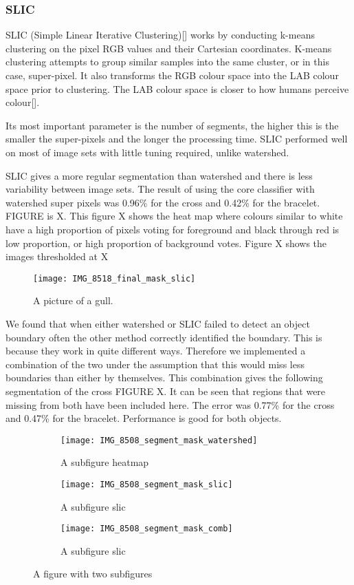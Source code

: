 \documentclass[12pt]{IIBproject}
\begin{document}
\subsubsection{SLIC}
SLIC (Simple Linear Iterative Clustering)[] works by conducting k-means clustering on the pixel RGB values and their Cartesian coordinates. K-means clustering attempts to group similar samples into the same cluster, or in this case, super-pixel. It also transforms the RGB colour space into the LAB colour space prior to clustering. The LAB colour space is closer to how humans perceive colour[].

 Its most important parameter is the number of segments, the higher this is the smaller the super-pixels and the longer the processing time. SLIC performed well on most of image sets with little tuning required, unlike watershed. 
 
SLIC gives a more regular segmentation than watershed and there is less variability between image sets. The result of using the core classifier with watershed super pixels was 0.96\% for the cross and 0.42\% for the bracelet. FIGURE is X. This figure X shows the heat map where colours similar to white have a high proportion of pixels voting for foreground and black through red is low proportion, or high proportion of background votes. Figure X shows the images thresholded at X%
\begin{figure}[H]
  \caption{A picture of a gull.}
  \centering
    \texttt{[image: IMG\_8518\_final\_mask\_slic]}
\end{figure}
We found that when either watershed or SLIC failed to detect an object boundary  often the other method correctly identified the boundary. This is because they work in quite different ways. Therefore we implemented a combination of the two under the assumption that this would miss less boundaries than either by themselves. This combination gives the following segmentation of the cross FIGURE X. It can be seen that regions that were missing from both have been included here. The error was 0.77\% for the cross and 0.47\% for the bracelet. Performance is good for both objects. 

 \begin{figure}[H]
\centering
\begin{subfigure}{.5\textwidth}
  \centering
  \texttt{[image: IMG\_8508\_segment\_mask\_watershed]}
  \caption{A subfigure heatmap}
  \label{fig:sub2}
\end{subfigure}
\begin{subfigure}{.5\textwidth}
  \centering
  \texttt{[image: IMG\_8508\_segment\_mask\_slic]}
  \caption{A subfigure slic}
  \label{fig:sub1}
\end{subfigure}%
\begin{subfigure}{.5\textwidth}
  \centering
  \texttt{[image: IMG\_8508\_segment\_mask\_comb]}
  \caption{A subfigure slic}
  \label{fig:sub1}
\end{subfigure}%


\caption{A figure with two subfigures}
\label{fig:test}
\end{figure}
\end{document}
